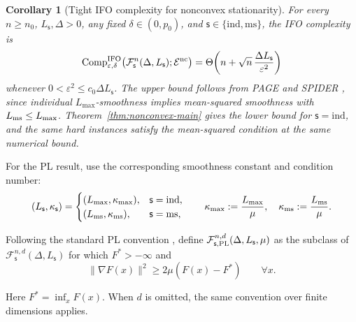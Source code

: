 \documentclass{article}
\newtheorem{corollary}[theorem]{Corollary}
\theoremstyle{definition}
\begin{document}
\begin{corollary}[Tight IFO complexity for nonconvex stationarity]
\label{cor:matching-complexity}
For every $n\ge n_0$, $L_{\mathsf s},\Delta>0$, any fixed
$\delta\in(0,p_0)$, and
$\mathsf s\in\{\mathrm{ind},\mathrm{ms}\}$, the IFO complexity is
\begin{equation}
 \operatorname{Comp}_{\varepsilon,\delta}^{\rm IFO}
 \bigl(\mathcal F_{\mathsf s}^n(\Delta,L_{\mathsf s});\mathcal E^{\rm nc}\bigr)
 =\Theta\!\left(
 n+\sqrt n\,\frac{\Delta L_{\mathsf s}}{\varepsilon^2}
 \right)
 \label{eq:matching-complexity}
\end{equation}
whenever $0<\varepsilon^2\le c_0\Delta L_{\mathsf s}$.  The upper bound follows
from PAGE and SPIDER \citep{fang2018spider,li2021page}, since individual
$L_{\max}$-smoothness implies mean-squared smoothness with
$L_{\rm ms}\le L_{\max}$.  Theorem~\ref{thm:nonconvex-main} gives the lower
bound for $\mathsf s=\mathrm{ind}$, and the same hard instances satisfy the
mean-squared condition at the same numerical bound.
\end{corollary}

For the PL result, use the corresponding smoothness constant and condition
number:
\begin{equation}
 (L_{\mathsf s},\kappa_{\mathsf s})=
 \begin{cases}
  (L_{\max},\kappa_{\max}),&\mathsf s=\mathrm{ind},\\
  (L_{\rm ms},\kappa_{\rm ms}),&\mathsf s=\mathrm{ms},
 \end{cases}
 \qquad
 \kappa_{\max}:=\frac{L_{\max}}\mu,
 \quad
 \kappa_{\rm ms}:=\frac{L_{\rm ms}}\mu.
 \label{eq:class-condition-numbers}
\end{equation}

Following the standard PL convention
\citep{polyak1963gradient,karimi2016linear}, define
$\mathcal F_{\mathsf s,\rm PL}^{n,d}(\Delta,L_{\mathsf s},\mu)$ as the subclass
of $\mathcal F_{\mathsf s}^{n,d}(\Delta,L_{\mathsf s})$ for which $F^*>-\infty$
and
\begin{equation}
 \|\nabla F(x)\|^2\ge2\mu(F(x)-F^*)
 \qquad\forall x.
 \label{eq:pl-definition}
\end{equation}

Here $F^*=\inf_xF(x)$.  When $d$ is omitted, the same convention over finite
dimensions applies.
\end{document}
